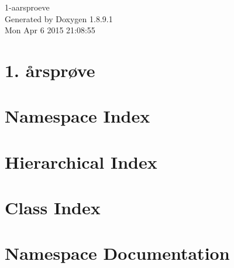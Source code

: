 \documentclass[twoside]{book}
\newcommand{\+}{\discretionary{\mbox{\scriptsize$\hookleftarrow$}}{}{}}
\newcommand{\clearemptydoublepage}{%
  \newpage{\pagestyle{empty}\cleardoublepage}%
}
\begin{document}
\hypersetup{pageanchor=false,
             bookmarks=true,
             bookmarksnumbered=true,
             pdfencoding=unicode
            }
\begin{titlepage}
\vspace*{7cm}
\begin{center}%
{\Large 1-\/aarsproeve }\\
\vspace*{1cm}
{\large Generated by Doxygen 1.8.9.1}\\
\vspace*{0.5cm}
{\small Mon Apr 6 2015 21:08:55}\\
\end{center}
\end{titlepage}
\clearemptydoublepage
\tableofcontents
\clearemptydoublepage
{}
\hypersetup{pageanchor=true}

\chapter{1. årsprøve}
\label{md__documents__git_hub_1-aarsproeve__r_e_a_d_m_e}
\hypertarget{md__documents__git_hub_1-aarsproeve__r_e_a_d_m_e}{}

\chapter{Namespace Index}

\chapter{Hierarchical Index}

\chapter{Class Index}

\chapter{Namespace Documentation}












\end{document}
